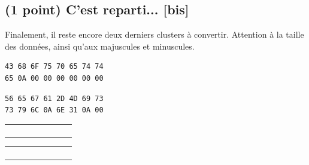 \documentclass[11pt,a4paper]{article}
\begin{document}
\bigskip


\bigskip


\subsection{(1 point) C'est reparti... [bis]}

\noindent Finalement, il reste encore deux derniers clusters à convertir.
Attention à la taille des données, ainsi qu'aux majuscules et minuscules.

\begin{table}[ht!]
  \centering
  \begin{minipage}{0.4\textwidth}
    \centering
\begin{lstlisting}[style=algorithmique]
43 68 6F 75 70 65 74 74
65 0A 00 00 00 00 00 00
\end{lstlisting}

\begin{lstlisting}[style=algorithmique]
56 65 67 61 2D 4D 69 73
73 79 6C 0A 6E 31 0A 00
\end{lstlisting}

  \end{minipage}
  \hfillx
  \begin{minipage}{0.45\textwidth}
    \centering

\begin{tabular}{ | m{0.45cm} | m{0.45cm} | m{0.45cm} | m{0.45cm}   |   m{0.45cm} | m{0.45cm} | m{0.45cm} | m{0.45cm} | }
\hline
 & & &   &   & & & \\
 & & &   &   & & & \\
\hline
 & & &   &   & & & \\
 & & &   &   & & & \\
\hline
\end{tabular}

\bigskip

\bigskip

\begin{tabular}{ | m{0.45cm} | m{0.45cm} | m{0.45cm} | m{0.45cm}   |   m{0.45cm} | m{0.45cm} | m{0.45cm} | m{0.45cm} | }
\hline
 & & &   &   & & & \\
 & & &   &   & & & \\
\hline
 & & &   &   & & & \\
 & & &   &   & & & \\
\hline
\end{tabular}

  \end{minipage}
\end{table}
\end{document}
